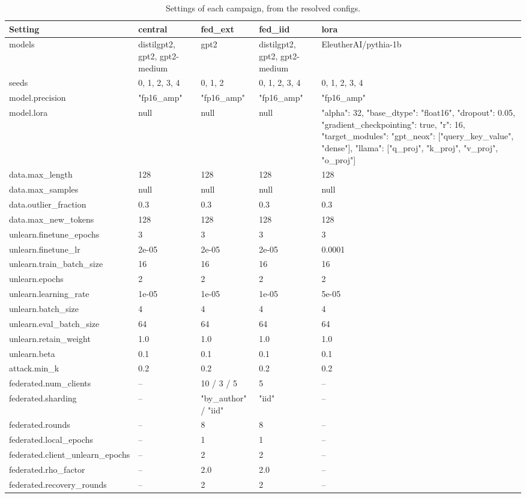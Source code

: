 \begin{table}[t]
\centering
\caption{Settings of each campaign, from the resolved configs.}
\label{tab:hyperparameters}
\footnotesize
\renewcommand{\arraystretch}{1.2}
\setlength{\tabcolsep}{5pt}
\begin{tabular*}{\textwidth}{@{\extracolsep{\fill}}lllll@{}}
\toprule
\textbf{Setting} & \textbf{central} & \textbf{fed\_ext} & \textbf{fed\_iid} & \textbf{lora} \\
\midrule
models & distilgpt2, gpt2, gpt2-medium & gpt2 & distilgpt2, gpt2, gpt2-medium & EleutherAI/pythia-1b \\
seeds & 0, 1, 2, 3, 4 & 0, 1, 2 & 0, 1, 2, 3, 4 & 0, 1, 2, 3, 4 \\
model.precision & "fp16\_amp" & "fp16\_amp" & "fp16\_amp" & "fp16\_amp" \\
model.lora & null & null & null & {"alpha": 32, "base\_dtype": "float16", "dropout": 0.05, "gradient\_checkpointing": true, "r": 16, "target\_modules": {"gpt\_neox": ["query\_key\_value", "dense"], "llama": ["q\_proj", "k\_proj", "v\_proj", "o\_proj"]}} \\
data.max\_length & 128 & 128 & 128 & 128 \\
data.max\_samples & null & null & null & null \\
data.outlier\_fraction & 0.3 & 0.3 & 0.3 & 0.3 \\
data.max\_new\_tokens & 128 & 128 & 128 & 128 \\
unlearn.finetune\_epochs & 3 & 3 & 3 & 3 \\
unlearn.finetune\_lr & 2e-05 & 2e-05 & 2e-05 & 0.0001 \\
unlearn.train\_batch\_size & 16 & 16 & 16 & 16 \\
unlearn.epochs & 2 & 2 & 2 & 2 \\
unlearn.learning\_rate & 1e-05 & 1e-05 & 1e-05 & 5e-05 \\
unlearn.batch\_size & 4 & 4 & 4 & 4 \\
unlearn.eval\_batch\_size & 64 & 64 & 64 & 64 \\
unlearn.retain\_weight & 1.0 & 1.0 & 1.0 & 1.0 \\
unlearn.beta & 0.1 & 0.1 & 0.1 & 0.1 \\
attack.min\_k & 0.2 & 0.2 & 0.2 & 0.2 \\
federated.num\_clients & -- & 10 / 3 / 5 & 5 & -- \\
federated.sharding & -- & "by\_author" / "iid" & "iid" & -- \\
federated.rounds & -- & 8 & 8 & -- \\
federated.local\_epochs & -- & 1 & 1 & -- \\
federated.client\_unlearn\_epochs & -- & 2 & 2 & -- \\
federated.rho\_factor & -- & 2.0 & 2.0 & -- \\
federated.recovery\_rounds & -- & 2 & 2 & -- \\
\bottomrule
\end{tabular*}
\end{table}
